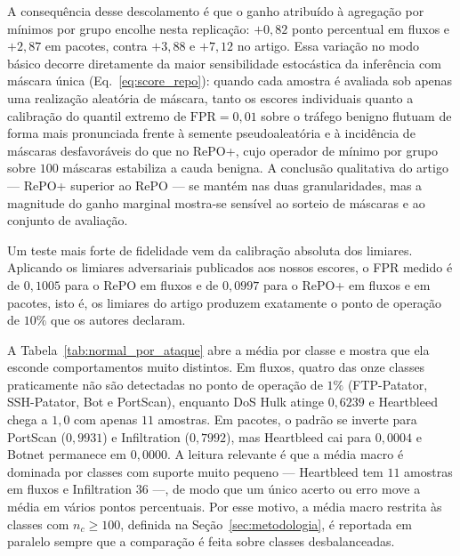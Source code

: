 \documentclass[conference]{IEEEtran}
\begin{document}
A consequência desse descolamento é que o ganho atribuído à agregação por mínimos por grupo encolhe nesta replicação: $+0{,}82$ ponto percentual em fluxos e $+2{,}87$ em pacotes, contra $+3{,}88$ e $+7{,}12$ no artigo.
Essa variação no modo básico decorre diretamente da maior sensibilidade estocástica da inferência com máscara única (Eq.~\eqref{eq:score_repo}): quando cada amostra é avaliada sob apenas uma realização aleatória de máscara, tanto os escores individuais quanto a calibração do quantil extremo de $\text{FPR} = 0{,}01$ sobre o tráfego benigno flutuam de forma mais pronunciada frente à semente pseudoaleatória e à incidência de máscaras desfavoráveis do que no RePO+, cujo operador de mínimo por grupo sobre $100$ máscaras estabiliza a cauda benigna.
A conclusão qualitativa do artigo — RePO+ superior ao RePO — se mantém nas duas granularidades, mas a magnitude do ganho marginal mostra-se sensível ao sorteio de máscaras e ao conjunto de avaliação.

Um teste mais forte de fidelidade vem da calibração absoluta dos limiares.
Aplicando os limiares adversariais publicados aos nossos escores, o FPR medido é de $0{,}1005$ para o RePO em fluxos e de $0{,}0997$ para o RePO+ em fluxos e em pacotes, isto é, os limiares do artigo produzem exatamente o ponto de operação de $10\%$ que os autores declaram.

A Tabela~\ref{tab:normal_por_ataque} abre a média por classe e mostra que ela esconde comportamentos muito distintos.
Em fluxos, quatro das onze classes praticamente não são detectadas no ponto de operação de $1\%$ (FTP-Patator, SSH-Patator, Bot e PortScan), enquanto DoS Hulk atinge $0{,}6239$ e Heartbleed chega a $1{,}0$ com apenas $11$ amostras.
Em pacotes, o padrão se inverte para PortScan ($0{,}9931$) e Infiltration ($0{,}7992$), mas Heartbleed cai para $0{,}0004$ e Botnet permanece em $0{,}0000$.
A leitura relevante é que a média macro é dominada por classes com suporte muito pequeno — Heartbleed tem $11$ amostras em fluxos e Infiltration $36$ —, de modo que um único acerto ou erro move a média em vários pontos percentuais.
Por esse motivo, a média macro restrita às classes com $n_c \ge 100$, definida na Seção~\ref{sec:metodologia}, é reportada em paralelo sempre que a comparação é feita sobre classes desbalanceadas.
\end{document}
